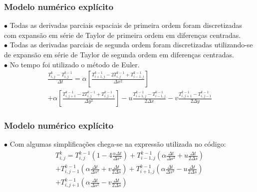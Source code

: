 \documentclass[xcolor=dvipsnames,10pt,aspectratio=169]{beamer}
\begin{document}
	\begin{frame}
		\frametitle{Modelo numérico explícito}

		$\bullet$ Todas as derivadas parciais espaciais de primeira ordem foram discretizadas com expansão em série de Taylor de primeira ordem em diferenças centradas.\\
		$\bullet$ Todas as derivadas parciais de segunda ordem foram discretizadas utilizando-se de expansão em série de Taylor de segunda ordem em diferenças centradas.\\
		$\bullet$ No tempo foi utilizado o método de Euler.\\

		\begin{equation}
			\begin{split}
			\frac{T_{i,j}^{k} - T_{i , j}^{k-1} }{\Delta t}
			= \alpha \left[  \frac{T_{i+1,j}^{k-1} - 2 T_{i,j}^{k-1} + T_{i-1,j}^{k-1} }{\Delta x^2} \right]\\
			+\alpha \left[\frac{T_{i,j+1}^{k-1} - 2 T_{i,j}^{k-1} + T_{i,j-1}^{k-1}}{\Delta y^2}\right] - u \frac{T_{i+1,j}^{k-1} - T_{i-1,j}^{k-1}}{2 \Delta x} - v \frac{T_{i,j+1}^{k-1} - T_{i , j-1}^{k-1}}{2 \Delta y}
			\end{split}
		\end{equation}

	\end{frame}





	\begin{frame}
		\frametitle{Modelo numérico explícito}
		$\bullet$ Com algumas simplificações chega-se na expressão utilizada no código:
		\begin{equation}
			\begin{split}
			T_{i,j}^{k} = T_{i,j}^{k-1} \left( 1 - 4 \frac{\alpha \Delta t}{\Delta s ^2}\right) + T_{i -1, j}^{k-1} \left( \alpha \frac{\Delta t}{\Delta s^2} + u \frac{\Delta t}{2 \Delta s} \right)\\
			+ T_{i,j-1}^{k-1} \left( \alpha \frac{\Delta t}{\Delta s^2} + v \frac{\Delta t}{2 \Delta s} \right) +  T_{i+1,j}^{k-1} \left( \alpha \frac{\Delta t}{ \Delta s^2} - u \frac{\Delta t}{2 \Delta s}\right) \\
			+  T_{i,j+1}^{k-1} \left( \alpha \frac{\Delta t}{\Delta s^2} - v \frac{\Delta t}{2 \Delta s}\right)
			\end{split}
		\end{equation}
	\end{frame}
\end{document}
